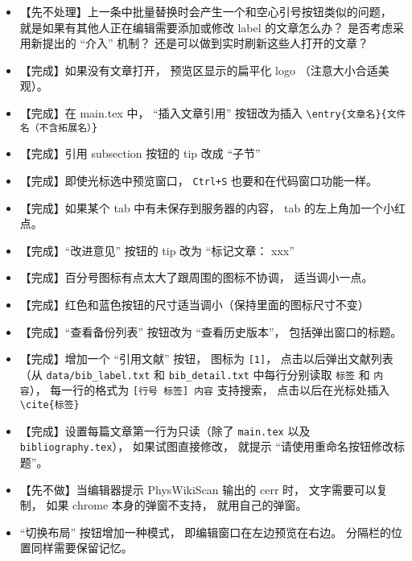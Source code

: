 \begin{itemize}
\item 【先不处理】上一条中批量替换时会产生一个和空心引号按钮类似的问题， 就是如果有其他人正在编辑需要添加或修改 label 的文章怎么办？ 是否考虑采用新提出的 “介入” 机制？ 还是可以做到实时刷新这些人打开的文章？

\item 【完成】如果没有文章打开， 预览区显示的扁平化 logo （注意大小合适美观）。

\item 【完成】在 main.tex 中， “插入文章引用” 按钮改为插入 \verb`\entry{文章名}{文件名（不含拓展名）}`

\item 【完成】引用 subsection 按钮的 tip 改成 “子节”

\item 【完成】即使光标选中预览窗口， \verb`Ctrl+S` 也要和在代码窗口功能一样。

\item 【完成】如果某个 tab 中有未保存到服务器的内容， tab 的左上角加一个小红点。

\item 【完成】“改进意见” 按钮的 tip 改为 “标记文章： xxx”

\item 【完成】百分号图标有点太大了跟周围的图标不协调， 适当调小一点。

\item 【完成】红色和蓝色按钮的尺寸适当调小（保持里面的图标尺寸不变）

\item 【完成】“查看备份列表” 按钮改为 “查看历史版本”， 包括弹出窗口的标题。

\item 【完成】增加一个 “引用文献” 按钮， 图标为 \verb`[1]`， 点击以后弹出文献列表（从 \verb`data/bib_label.txt` 和 \verb`bib_detail.txt` 中每行分别读取 \verb`标签` 和 \verb`内容`）， 每一行的格式为 \verb`[行号 标签] 内容` 支持搜索， 点击以后在光标处插入 \verb`\cite{标签}`

\item 【完成】设置每篇文章第一行为只读（除了 \verb`main.tex` 以及 \verb`bibliography.tex`）， 如果试图直接修改， 就提示 “请使用重命名按钮修改标题”。

\item 【先不做】当编辑器提示 PhysWikiScan 输出的 cerr 时， 文字需要可以复制， 如果 chrome 本身的弹窗不支持， 就用自己的弹窗。

\item “切换布局” 按钮增加一种模式， 即编辑窗口在左边预览在右边。 分隔栏的位置同样需要保留记忆。


\end{itemize}
